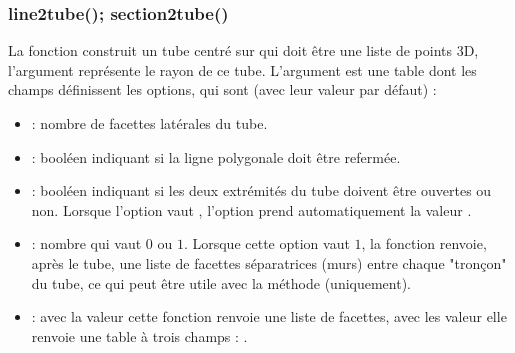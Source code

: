 \subsubsection{line2tube(); section2tube()}

La fonction  construit un tube centré sur  qui doit être une liste de points 3D, l'argument  représente le rayon de ce tube. L'argument  est une table dont les champs définissent les options, qui sont (avec leur valeur  par défaut) :
    \begin{itemize}
        \item {} : nombre de facettes latérales du tube.
        
        \item {} : booléen indiquant si la ligne polygonale doit être refermée.
        
        \item {} : booléen indiquant si les deux extrémités du tube doivent être ouvertes ou non. Lorsque l'option  vaut \true, l'option  prend automatiquement la valeur \true.
        
        \item {} : nombre qui vaut $0$ ou $1$. Lorsque cette option vaut $1$, la fonction renvoie, après le tube, une liste de facettes séparatrices (murs) entre chaque "tronçon" du tube, ce qui peut être utile avec la méthode  (uniquement).
        
        \item {} : avec la valeur \false cette fonction renvoie une liste de facettes, avec les valeur \true elle renvoie une table à trois champs : .
    \end{itemize}
    
